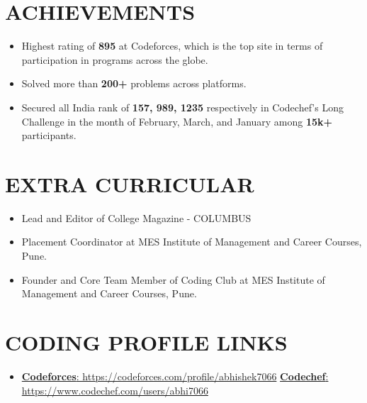 \documentclass[letterpaper,11pt]{article}
\newcommand{\resumeItem}[1]{
  \item\small{
    {#1 \vspace{-2pt}}
  }
}
\newcommand{\resumeItemListStart}{\begin{itemize}}
\newcommand{\resumeItemListEnd}{\end{itemize}\vspace{-5pt}}
\begin{document}
\section{ACHIEVEMENTS}
 \begin{itemize}[leftmargin=0.08in, label={}]
    \resumeItemListStart
    
       
        \resumeItem{Highest rating of \textbf{895} at Codeforces, which is the top site in terms of participation in programs across the globe.}
     
        \resumeItem{Solved more than \textbf{200+} problems across  platforms.}
            
        \resumeItem{Secured all India rank of \textbf{157, 989, 1235}        respectively in Codechef's Long Challenge in the month of            February, March, and January among \textbf{15k+} participants.}
     
 	\resumeItemListEnd
 \end{itemize}
 \vspace{-11pt}



\section{EXTRA CURRICULAR}
 \begin{itemize}[leftmargin=0.08in, label={}]
    \resumeItemListStart
     
        \resumeItem{Lead and Editor of College Magazine - COLUMBUS}

        \resumeItem{Placement Coordinator at MES Institute of Management and Career Courses, Pune.}

         \resumeItem{Founder and Core Team Member of Coding Club at MES Institute of Management and Career Courses, Pune.}
     
 	\resumeItemListEnd
 \end{itemize}
 \vspace{-11pt}





\section{CODING PROFILE LINKS}
\begin{itemize}[leftmargin=0.15in, label={}]
    

        \resumeItem {\href{https://codeforces.com/profile/abhishek7066}{\textbf{Codeforces}: https://codeforces.com/profile/abhishek7066} \textbar{} \href{https://www.codechef.com/users/abhi7066}{\textbf{Codechef}: https://www.codechef.com/users/abhi7066}}
   
\end{itemize}
\vspace{-11pt}
\end{document}
